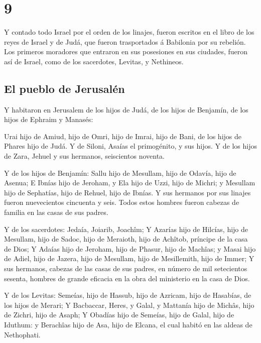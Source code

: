 \hypertarget{section-8}{%
\section{9}\label{section-8}}

 Y contado todo Israel por el orden de los linajes, fueron
escritos en el libro de los reyes de Israel y de Judá, que fueron
trasportados á Babilonia por su rebelión.  Los primeros
moradores que entraron en sus posesiones en sus ciudades, fueron así de
Israel, como de los sacerdotes, Levitas, y Nethineos.

\hypertarget{el-pueblo-de-jerusaluxe9n}{%
\subsection{El pueblo de Jerusalén}\label{el-pueblo-de-jerusaluxe9n}}

 Y habitaron en Jerusalem de los hijos de Judá, de los hijos
de Benjamín, de los hijos de Ephraim y Manasés:

 Urai hijo de Amiud, hijo de Omri, hijo de Imrai, hijo de
Bani, de los hijos de Phares hijo de Judá.  Y de Siloni,
Asaías el primogénito, y sus hijos.  Y de los hijos de Zara,
Jehuel y sus hermanos, seiscientos noventa.

 Y de los hijos de Benjamín: Sallu hijo de Mesullam, hijo de
Odavía, hijo de Asenua;  E Ibnías hijo de Jeroham, y Ela
hijo de Uzzi, hijo de Michri; y Mesullam hijo de Sephatías, hijo de
Rehuel, hijo de Ibnías.  Y sus hermanos por sus linajes
fueron nuevecientos cincuenta y seis. Todos estos hombres fueron cabezas
de familia en las casas de sus padres.

 Y de los sacerdotes: Jedaía, Joiarib, Joachîm;
 Y Azarías hijo de Hilcías, hijo de Mesullam, hijo de
Sadoc, hijo de Meraioth, hijo de Achîtob, príncipe de la casa de Dios;
 Y Adaías hijo de Jeroham, hijo de Phasur, hijo de Machîas;
y Masai hijo de Adiel, hijo de Jazera, hijo de Mesullam, hijo de
Mesillemith, hijo de Immer;  Y sus hermanos, cabezas de las
casas de sus padres, en número de mil setecientos sesenta, hombres de
grande eficacia en la obra del ministerio en la casa de Dios.

 Y de los Levitas: Semeías, hijo de Hassub, hijo de
Azricam, hijo de Hasabías, de los hijos de Merari;  Y
Bacbaccar, Heres, y Galal, y Mattanía hijo de Michâs, hijo de Zichri,
hijo de Asaph;  Y Obadías hijo de Semeías, hijo de Galal,
hijo de Iduthum: y Berachîas hijo de Asa, hijo de Elcana, el cual habitó
en las aldeas de Nethophati.

